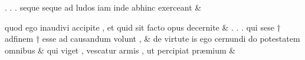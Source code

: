 \documentclass[12pt,onecolumn,twoside,a4paper]{memoir}
\begin{document}
               \begin{pairs}
                  \begin{Leftside}
			\beginnumbering
			\setcounter{stanzaL}{0}
                     
                         \stanza {}
                     
                              .
                              .
                              .
                              seque
                              {seque}
                              ad
                              ludos
                              iam
                              inde
                              abhinc
                              exerceant \&
                         \stanza {}
                     
                              quod
                              ego
                              inaudivi
                              accipite
                              ,
                              et
                              quid
                              sit
                              facto
                              opus
                              decernite \&
                         \stanza {}.
                              .
                              .
                              qui
                              sese
                              †
                              adfinem
                              †
                              esse
                              ad
                              causandum
                              volunt
                              , & 
                     de
                              virtute
                              is
                              ego
                              cernundi
                              do
                              potestatem
                              omnibus \&
                         \stanza {}
                     qui
                              viget
                              ,
                              vescatur
                              armis
                              ,
                              ut
                              percipiat
                              præmium \&
                         \stanza {}
                     

\end{Leftside}
\end{pairs}
\end{document}
